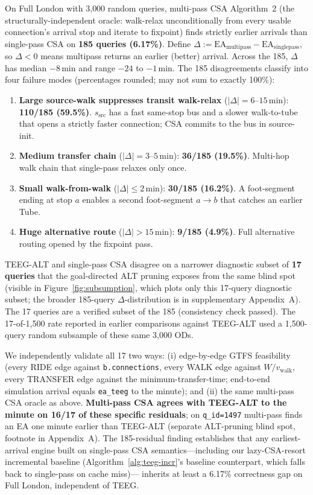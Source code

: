 \documentclass[letterpaper]{article}
\theoremstyle{definition}
\theoremstyle{plain}
\begin{document}
On Full London with 3{,}000 random queries, multi-pass CSA Algorithm~2
\cite{dibbelt2018csa} (the structurally-independent oracle: walk-relax
unconditionally from every usable connection's arrival stop and iterate
to fixpoint) finds strictly earlier arrivals than single-pass CSA on
\textbf{185 queries (6.17\%)}. Define $\Delta \!:=\! \text{EA}_\text{multipass}
\!-\! \text{EA}_\text{singlepass}$, so $\Delta\!<\!0$ means multipass returns
an earlier (better) arrival. Across the 185, $\Delta$ has median
$-8$\,min and range $-24$ to $-1$\,min. The 185 disagreements classify
into four failure modes (percentages rounded; may not sum to exactly 100\%):
\begin{enumerate}
\item \textbf{Large source-walk suppresses transit walk-relax}
($|\Delta|\!=\!6\text{--}15$\,min): \textbf{110/185 (59.5\%)}.
$s_\text{src}$ has a fast same-stop bus and a slower walk-to-tube
that opens a strictly faster connection; CSA commits to the bus
in source-init.
\item \textbf{Medium transfer chain} ($|\Delta|\!=\!3\text{--}5$\,min):
\textbf{36/185 (19.5\%)}. Multi-hop walk chain that single-pass
relaxes only once.
\item \textbf{Small walk-from-walk} ($|\Delta|\!\leq\!2$\,min):
\textbf{30/185 (16.2\%)}. A foot-segment ending at stop $a$ enables
a second foot-segment $a\!\to\!b$ that catches an earlier Tube.
\item \textbf{Huge alternative route} ($|\Delta|\!>\!15$\,min):
\textbf{9/185 (4.9\%)}. Full alternative routing opened by the
fixpoint pass.
\end{enumerate}
TEEG-ALT and single-pass CSA disagree on a narrower diagnostic
subset of \textbf{17 queries} that the goal-directed ALT pruning
exposes from the same blind spot (visible in
Figure~\ref{fig:subsumption}, which plots only this 17-query
diagnostic subset; the broader 185-query $\Delta$-distribution is
in supplementary Appendix~A). The 17 queries are a verified subset
of the 185 (consistency check passed). The 17-of-1{,}500 rate
reported in earlier comparisons against TEEG-ALT used a 1{,}500-query
random subsample of these same 3{,}000 ODs.

We independently validate all 17 two ways: (i) edge-by-edge GTFS
feasibility (every RIDE edge against \texttt{b.connections}, every
WALK edge against $W/v_\text{walk}$, every TRANSFER edge against
the minimum-transfer-time; end-to-end simulation arrival equals
\texttt{ea\_teeg} to the minute); and (ii) the same multi-pass CSA
oracle as above. \textbf{Multi-pass CSA agrees with TEEG-ALT to the
minute on 16/17 of these specific residuals}; on \texttt{q\_id=1497}
multi-pass finds an EA one minute earlier than TEEG-ALT (separate
ALT-pruning blind spot, footnote in Appendix~A). The 185-residual
finding establishes that any earliest-arrival engine built on
single-pass CSA semantics—including our lazy-CSA-resort
incremental baseline (Algorithm~\ref{alg:teeg-incr}'s baseline
counterpart, which falls back to single-pass on cache miss)—
inherits at least a 6.17\% correctness gap on Full London,
independent of TEEG.
\end{document}
